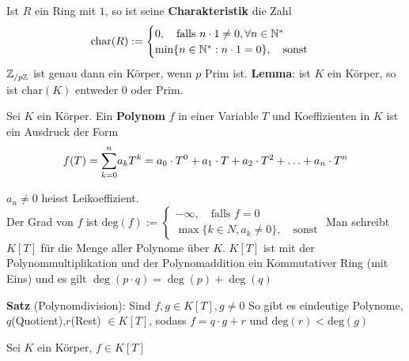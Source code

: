 Ist $R$ ein Ring mit $1$, so ist seine \textbf{Charakteristik} die Zahl
\begin{align*}
    \text{char}(R):= \begin{cases}
        0, \text{\quad falls } n\cdot 1 \neq 0, \forall n \in \mathbb{N}^*\\
        \min\{n \in \mathbb{N}^*: n\cdot 1 = 0\}, \quad \text{sonst}
    \end{cases}
\end{align*}
$\mathbb{Z}_{/p\mathbb{Z}}$ ist genau dann ein Körper, wenn $p$ Prim ist.
\textbf{Lemma}: \quad ist $K$ ein Körper, so ist $\text{char}(K)$ entweder $0$ oder Prim.
\begin{mdframed}

Sei $K$ ein Körper. Ein \textbf{Polynom} $f$ in einer Variable $T$ und Koeffizienten in $K$ ist ein Ausdruck der Form
\begin{align*}
    f(T) = \underset{k = 0}{\overset{n}{\sum}} a_{k} T^{k} = a_0 \cdot T^0 + a_1\cdot T + a_2 \cdot T^2 + \ldots + a_n \cdot T^n
\end{align*}
\end{mdframed}
$a_n \neq 0$ heisst Leikoeffizient.\\
Der Grad von $f$ ist $\text{deg}(f) := \begin{cases}
    -\infty, \quad \text{falls } f = 0 \\
    \max\{k \in N, a_k \neq 0\}, \quad \text{sonst}
\end{cases}$
Man schreibt $K[T]$ für die Menge aller Polynome über $K$. \quad $K[T]$ ist mit der Polynommultiplikation und der Polynomaddition ein Kommutativer Ring (mit Eins) und es gilt $\deg(p\cdot q) = \deg(p) + \deg(q)$
\begin{mdframed}
\textbf{Satz} (Polynomdivision): \quad Sind $f,g \in K[T], g \neq 0$ So gibt es eindeutige Polynome, $q$(Quotient),$r$(Rest) $\in K[T]$, sodass $f = q \cdot g + r$ und $\text{deg}(r) <\text{deg}(g)$
\end{mdframed}
 Sei $K$ ein Körper, $f \in K[T]$
